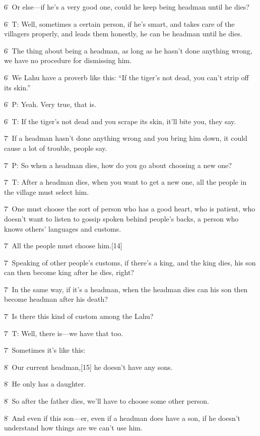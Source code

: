 {6\. Or else---if he's a very good one, could he keep being headman until
he dies?}

{6\. T: Well, sometimes a certain person, if he's smart, and takes care
of the villagers properly, and leads them honestly, he can be headman until he
dies.}

{6\. The thing about being a headman, as long as he hasn't done anything
wrong, we have no procedure for dismissing him.}

{6\. We Lahu have a proverb like this: ``If the tiger's not dead, you can't
strip off its skin.''}

{6\. P: Yeah. Very true, that is.}

{6\. T: If the tiger's not dead and you scrape its skin, it'll bite you,
they say.}

{7\. If a headman hasn't done anything wrong and you bring him down, it
could cause a lot of trouble, people say.}

{7\. P: So when a headman dies, how do you go about choosing a new one?}

{7\. T: After a headman dies, when you want to get a new one, all the people
in the village must select him.}

{7\. One must choose the sort of person who has a good heart, who is patient,
who doesn't want to listen to gossip spoken behind people's backs, a person who
knows others' languages and customs.}

{7\. All the people must choose him.[14]}

{7\. Speaking of other people's customs, if there's a king, and the king
dies, his son can then become king after he dies, right?}

{7\. In the same way, if it's a headman, when the headman dies can his son
then become headman after his death?}

{7\. Is there this kind of custom among the Lahu?}

{7\. T: Well, there is---we have that too.}

{7\. Sometimes it's like this:}

{8\. Our current headman,[15] he doesn't have any sons.}

{8\. He only has a daughter.}

{8\. So after the father dies, we'll have to choose some other person.}

{8\. And even if this son---er, even if a headman does have a son, if he
doesn't understand how things are we can't use him.}

